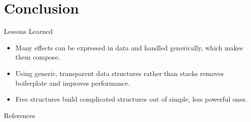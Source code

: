 \documentclass[aspectratio=169]{beamer}
\begin{document}
\section{Conclusion}

\begin{frame}{Lessons Learned}
  \begin{itemize}
  \item Many effects can be expressed in data and handled generically, which
    makes them compose.
  \item Using generic, transparent data structures rather than stacks removes
    boilerplate and improves performance.
  \item Free structures build complicated structures out of simple, less
    powerful ones.
  \end{itemize}
\end{frame}

\begin{frame}[allowframebreaks]{References}
  
  
\end{frame}
\end{document}
